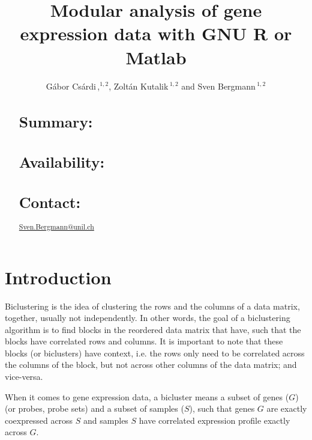 \documentclass{bioinfo}
\begin{document}

\title[Modular analysis]{Modular analysis of gene expression data with
  GNU R or Matlab}
\author[G\'abor Cs\'ardi \textit{et~al}]{G\'abor Cs\'ardi\,,$^{1,2}$,
  Zolt\'an Kutalik\,$^{1,2}$ and Sven Bergmann\,$^{1,2}$}
\address{$^{1}$Department of Medical Genetics, and 
  $^{2}$Swiss Institute of Bioinformatics,
  University of Lausanne, Rue de Bugnon 27, CH-1005 Lausanne,
  Switzerland.}



\maketitle

\begin{abstract}

\section{Summary:}
\section{Availability:}
\section{Contact:} \href{Sven.Bergmann@unil.ch}{Sven.Bergmann@unil.ch}
\end{abstract}

\section{Introduction}


Biclustering is the idea of clustering the rows and the columns of a
data matrix, together, usually not independently. In other words, the
goal of a biclustering algorithm is to find blocks in the reordered
data matrix that have, such that the blocks have correlated rows and
columns. It is important to note that these blocks (or biclusters)
have context, i.e. the rows only need to be correlated across the
columns of the block, but not across other columns of the data matrix;
and vice-versa.

When it comes to gene expression data, a bicluster means a subset of
genes ($G$) (or probes, probe sets) and a subset of samples ($S$),
such that genes $G$ are exactly coexpressed across $S$ and samples $S$
have correlated expression profile exactly across $G$.
\end{document}
